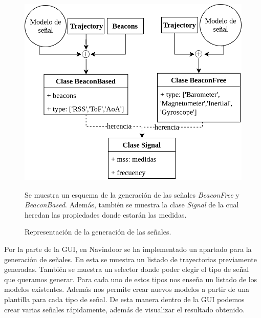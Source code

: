 \begin{figure}[ht!]
    \centering
        \includegraphics[width=0.85\columnwidth]{img/Design/signaldiagram.png}
        \caption{Representación de la generación de las señales.}
        \small
        Se muestra un esquema de la generación de las señales \emph{BeaconFree} y \emph{BeaconBased}. Además, también se muestra la clase \emph{Signal} de la cual heredan las propiedades donde estarán las medidas.
        \label{schemaBB}
    \end{figure} 

 

Por la parte de la GUI, en Navindoor se ha implementado un apartado para la generación de señales. En esta se muestra un listado de trayectorias previamente generadas. También se muestra un selector donde poder elegir el tipo de señal que queramos generar. Para cada uno de estos tipos nos enseña un listado de los modelos existentes. Además nos permite crear nuevos modelos a partir de una plantilla para cada tipo de señal. De esta manera dentro de la GUI podemos crear varias señales rápidamente, además de visualizar el resultado obtenido. 



